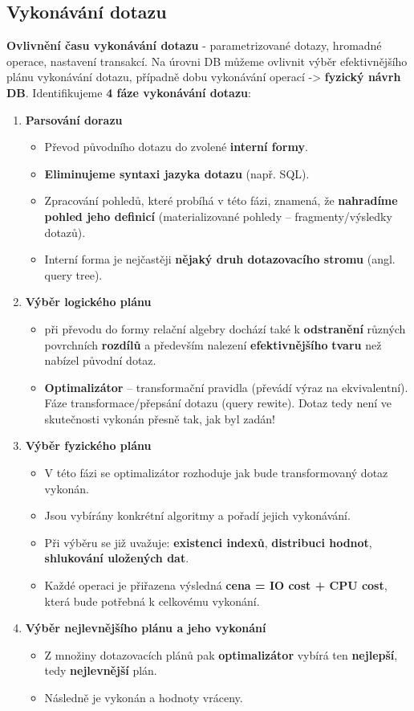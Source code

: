 \subsection{Vykonávání dotazu}
\textbf{Ovlivnění času vykonávání dotazu} - parametrizované dotazy, hromadné operace, nastavení transakcí. Na úrovni DB můžeme ovlivnit výběr efektivnějšího plánu vykonávání dotazu, případně dobu vykonávání operací -> \textbf{fyzický návrh DB}. Identifikujeme \textbf{4 fáze vykonávání dotazu}:

\begin{enumerate}
	\item \textbf{Parsování dorazu}
	\begin{itemize}
		\item Převod původního dotazu do zvolené \textbf{interní formy}.
		\item \textbf{Eliminujeme syntaxi jazyka dotazu} (např. SQL).
		\item Zpracování pohledů, které probíhá v této fázi, znamená, že \textbf{nahradíme pohled jeho definicí} (materializované pohledy -- fragmenty/výsledky dotazů).
		\item Interní forma je nejčastěji \textbf{nějaký druh dotazovacího stromu} (angl. query tree).
	\end{itemize}
	\item \textbf{Výběr logického plánu}
	\begin{itemize}
		\item při převodu do formy relační algebry dochází také k \textbf{odstranění} různých povrchních \textbf{rozdílů} a především nalezení \textbf{efektivnějšího} \textbf{tvaru} než nabízel původní dotaz.
		\item \textbf{Optimalizátor} – transformační pravidla (převádí výraz na ekvivalentní). Fáze transformace/přepsání dotazu (query rewite). Dotaz tedy není ve skutečnosti vykonán přesně tak, jak byl zadán! 
	\end{itemize}
	\item \textbf{Výběr fyzického plánu}
	\begin{itemize}
		\item V této fázi se optimalizátor rozhoduje jak bude transformovaný dotaz vykonán.
		\item Jsou vybírány konkrétní algoritmy a pořadí jejich vykonávání.
		\item Při výběru se již uvažuje: \textbf{existenci indexů}, \textbf{distribuci hodnot}, \textbf{shlukování uložených dat}.
		\item Každé operaci je přiřazena výsledná \textbf{cena = IO cost + CPU cost}, která bude potřebná k celkovému vykonání.
	\end{itemize}
	\item \textbf{Výběr nejlevnějšího plánu a jeho vykonání}
	\begin{itemize}		
		\item Z množiny dotazovacích plánů pak \textbf{optimalizátor} vybírá ten \textbf{nejlepší}, tedy \textbf{nejlevnější} plán.
		\item Následně je vykonán a hodnoty vráceny.
	\end{itemize}
\end{enumerate}

